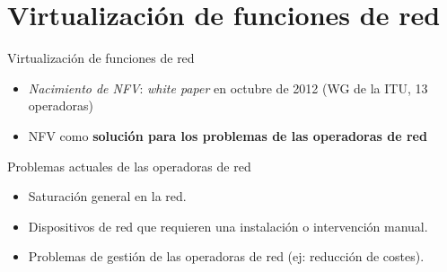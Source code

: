 \documentclass[aspectratio=169,xcolor=dvipsnames]{beamer}
\begin{document}

	\section{Virtualización de funciones de red}
	
	\begin{frame}{Virtualización de funciones de red}
		\begin{itemize}
		    \item \textit{Nacimiento de NFV}: \textit{white paper} en octubre de 2012 (WG de la ITU, 13 operadoras)
		    \item NFV como \textbf{solución para los problemas de las operadoras de red}
		\end{itemize}
		
		\begin{alertblock}{Problemas actuales de las operadoras de red}
		    \begin{itemize}
		        \item Saturación general en la red.
		        \item Dispositivos de red que requieren una instalación o intervención manual.
		        \item Problemas de gestión de las operadoras de red (ej: reducción de costes).
		    \end{itemize}
		\end{alertblock}
	\end{frame}
	
\end{document}
